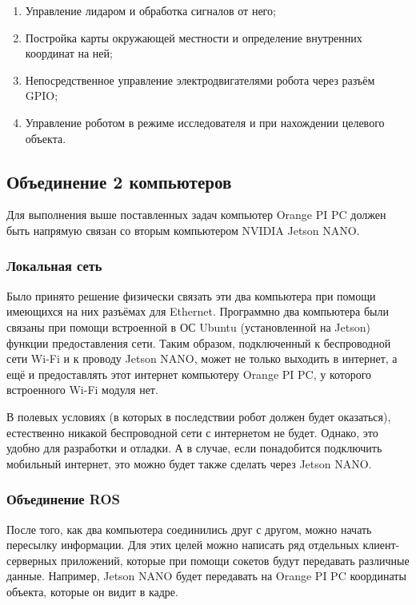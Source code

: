 \begin{enumerate}
	\item Управление лидаром и обработка сигналов от него;
	\item Постройка карты окружающей местности и определение внутренних координат на ней;
	\item Непосредственное управление электродвигателями робота через разъём GPIO;
	\item Управление роботом в режиме исследователя и при нахождении целевого объекта.
\end{enumerate}

\subsection{Объединение 2 компьютеров}

Для выполнения выше поставленных задач компьютер Orange PI PC должен быть напрямую связан со вторым компьютером NVIDIA Jetson NANO.

\subsubsection{Локальная сеть}

Было принято решение физически связать эти два компьютера при помощи имеющихся на них разъёмах для Ethernet. Программно два компьютера были связаны при помощи встроенной в ОС Ubuntu (установленной на Jetson) функции предоставления сети. Таким образом, подключенный к беспроводной сети Wi-Fi и к проводу Jetson NANO, может не только выходить в интернет, а ещё и предоставлять этот интернет компьютеру Orange PI PC, у которого встроенного Wi-Fi модуля нет. 

В полевых условиях (в которых в последствии робот должен будет оказаться), естественно никакой беспроводной сети с интернетом не будет. Однако, это удобно для разработки и отладки. А в случае, если понадобится подключить мобильный интернет, это можно будет также сделать через Jetson NANO.

\subsubsection{Объединение ROS}
После того, как два компьютера соединились друг с другом, можно начать пересылку информации. Для этих целей можно написать ряд отдельных клиент-серверных приложений, которые при помощи сокетов будут передавать различные данные. Например, Jetson NANO будет передавать на Orange PI PC координаты объекта, которые он видит в кадре.

